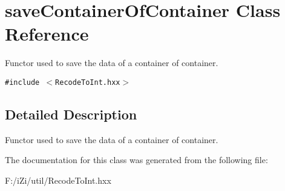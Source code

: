 \section{save\-Container\-Of\-Container Class Reference}
\label{classsave_container_of_container}
Functor used to save the data of a container of container.  


{\tt \#include $<$Recode\-To\-Int.hxx$>$}



\subsection{Detailed Description}
Functor used to save the data of a container of container. 



The documentation for this class was generated from the following file:\begin{CompactItemize}
\item 
F:/i\-Zi/util/Recode\-To\-Int.hxx\end{CompactItemize}

